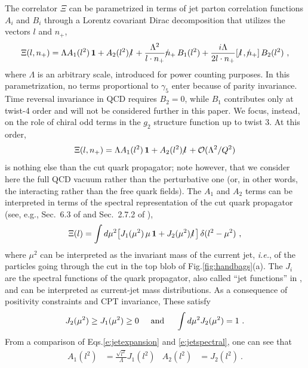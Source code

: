 \documentclass[preprintnumbers,floatfix,nofootinbib]{revtex4}
\newcommand{\lslash}{l \hspace{-0.19cm} / \,}
\newcommand{\nslash}{n \hspace{-0.24cm} / \,}
\newcommand{\id}{{\bm 1}
}
\begin{document}
The correlator $\Xi$ can be parametrized in terms of jet parton correlation
functions $A_i$ and $B_i$ through a Lorentz covariant Dirac decomposition that utilizes the vectors $l$ and $n_+$, 
\begin{equation}
\Xi(l,n_+) = \Lambda A_1(l^2)\,\id + A_2(l^2)\,\lslash 
+ \frac{\Lambda^2}{l \cdot n_{+}} \nslash_+ \, B_{1}(l^2)
+ \frac{i \Lambda}{2 l \cdot n_{+}} [\,\lslash,\nslash_+ ] \, B_{2}(l^2) \ ,
\label{e:jetexpansion}
\end{equation} 
where $\Lambda$ is an arbitrary scale, introduced for power counting purposes.
In this parametrization, no terms proportional to $\gamma_5$ enter because of parity invariance. Time reversal invariance in QCD requires $B_{2}=0$, while $B_{1}$ contributes only at twist-4 order and will not be considered further in this paper. We focus, instead, on the role of chiral odd terms in the $g_2$ structure function up to twist 3. At this order, 
\begin{equation}
  \Xi(l,n_+) = \Lambda A_1(l^2)\,\id + A_2(l^2)\,\lslash 
    + {\cal O}(\Lambda^2/Q^2)
\label{e:jetexpansion-tw3}
\end{equation} 
is nothing else than the cut quark propagator; note however, that we consider
here the full QCD vacuum rather than the perturbative one (or, in other words, the interacting rather than the free quark fields).
The $A_1$ and $A_2$ terms can be interpreted in terms of the spectral
representation of the cut quark propagator (see, e.g., Sec.~6.3 of
\cite{D'Hoker:2004aa} and Sec.~2.7.2 of \cite{Romao:2013aa}),
\begin{align} 
  \Xi(l) =  
  \int d \mu^2 \big[ J_1 (\mu^2)\,\mu\,\id + J_2 (\mu^2)\,\lslash \big] \,
  \delta(l^2 -\mu^2) \ ,
\label{e:jetspectral}
\end{align}
where $\mu^2$ can be interpreted as the invariant mass of the current jet, {\it
  i.e.}, of the particles going through the cut in the top blob of
Fig.\ref{fig:handbags}(a). The $J_i$ are the spectral functions of the
quark propagator, also called ``jet functions'' in
\cite{Accardi:2008ne}, and can be interpreted as current-jet mass distributions. As a consequence of positivity constraints and CPT invariance, These satisfy \cite{D'Hoker:2004aa,Romao:2013aa,Weinberg:1995mt}
\begin{align}
  J_2(\mu^2) \geq J_1(\mu^2) \geq 0
  \hspace*{0.5cm} \text{and} \hspace*{0.5cm}
  \int d\mu^2 J_2(\mu^2) = 1 \ .
\label{eq:jetfnsprops}
\end{align}
From a comparison of Eqs.\eqref{e:jetexpansion} and \eqref{e:jetspectral}, one can see that 
\begin{align}
  A_1(l^2)&=\frac{\sqrt{l^2}}{\Lambda}J_1(l^2) & A_2(l^2)&=J_2(l^2) \ .
  \label{eq:jet_vs_spectral}
\end{align}
\end{document}

